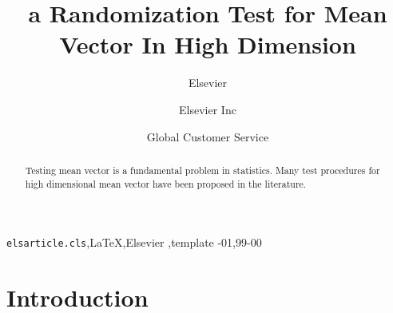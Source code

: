 \documentclass[review]{elsarticle}
\theoremstyle{plain}
\theoremstyle{definition}
\theoremstyle{remark}
\begin{document}
\begin{frontmatter}

\title{a Randomization Test for Mean Vector In High Dimension}

\author{Elsevier}
\address{Radarweg 29, Amsterdam}

\author[mymainaddress,mysecondaryaddress]{Elsevier Inc}

\author[mysecondaryaddress]{Global Customer Service}

\address[mymainaddress]{1600 John F Kennedy Boulevard, Philadelphia}
\address[mysecondaryaddress]{360 Park Avenue South, New York}

\begin{abstract}
    Testing mean vector is a fundamental problem in statistics.
    Many test procedures for high dimensional mean vector have been proposed in the literature.
\end{abstract}

\begin{keyword}
\texttt{elsarticle.cls}\sep \LaTeX\sep Elsevier \sep template
-01\sep  99-00
\end{keyword}

\end{frontmatter}

\linenumbers


\section{Introduction}
\end{document}

